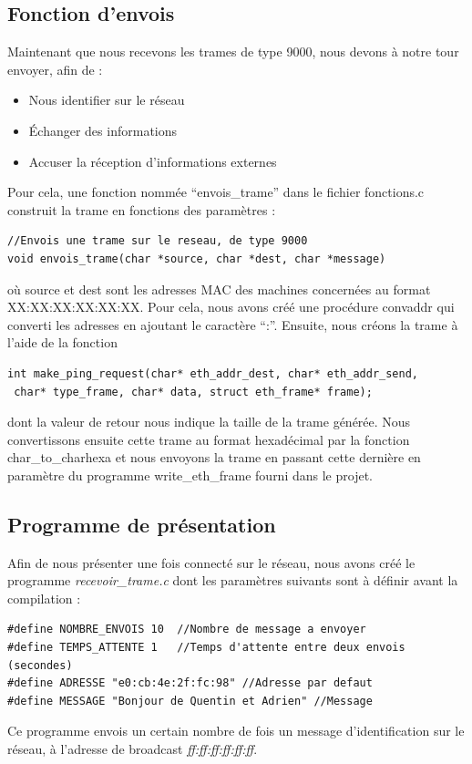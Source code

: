 \documentclass[a4paper,11pt]{article}
\begin{document}
	\subsection{Fonction d'envois}
	Maintenant que nous recevons les trames de type 9000, nous devons à notre tour envoyer, afin de :
	\begin{itemize}
	\item Nous identifier sur le réseau
	\item Échanger des informations
	\item Accuser la réception d'informations externes
	\end{itemize}
	Pour cela, une fonction nommée ``envois\_trame'' dans le fichier fonctions.c construit la trame en fonctions des paramètres :
	\lstset{language=C}
\begin{lstlisting}
//Envois une trame sur le reseau, de type 9000
void envois_trame(char *source, char *dest, char *message)
\end{lstlisting}
	où source et dest sont les adresses MAC des machines concernées au format XX:XX:XX:XX:XX:XX. Pour cela, nous avons créé une procédure convaddr qui converti les adresses en ajoutant le caractère \enquote{:}. Ensuite, nous créons la trame à l'aide de la fonction
	\lstset{language=C}
\begin{lstlisting}
int make_ping_request(char* eth_addr_dest, char* eth_addr_send,
 char* type_frame, char* data, struct eth_frame* frame);
\end{lstlisting}
	dont la valeur de retour nous indique la taille de la trame générée. Nous convertissons ensuite cette trame au format hexadécimal par la fonction char\_to\_charhexa et nous envoyons la trame en passant cette dernière en paramètre du programme write\_eth\_frame fourni dans le projet.
	\subsection{Programme de présentation}
	Afin de nous présenter une fois connecté sur le réseau, nous avons créé le programme \textit{recevoir\_trame.c} dont les paramètres suivants sont à définir avant la compilation :
	\lstset{language=C}
\begin{lstlisting}
#define NOMBRE_ENVOIS 10  //Nombre de message a envoyer
#define TEMPS_ATTENTE 1	  //Temps d'attente entre deux envois (secondes)
#define ADRESSE "e0:cb:4e:2f:fc:98" //Adresse par defaut
#define MESSAGE "Bonjour de Quentin et Adrien" //Message
\end{lstlisting}
	Ce programme envois un certain nombre de fois un message d'identification sur le réseau, à l'adresse de broadcast \textit{ff:ff:ff:ff:ff:ff}.
\end{document}
